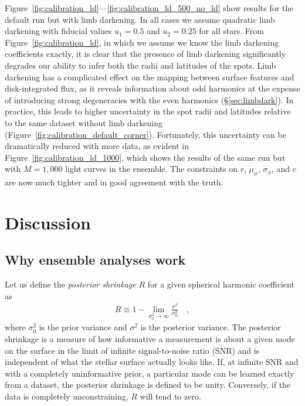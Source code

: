 \documentclass[modern]{aastex62}
\begin{document}
Figure~\ref{fig:calibration_ld}---\ref{fig:calibration_ld_500_no_ld}
show results for the default run but with limb darkening. In all cases
we assume quadratic limb darkening with fiducial values $u_1 = 0.5$
and $u_2 = 0.25$ for all stars. From Figure~\ref{fig:calibration_ld}, in which we
assume we know the limb darkening coefficients exactly, it is clear that
the presence of limb darkening significantly degrades our ability to
infer both the radii and latitudes of the spots. Limb darkening has a complicated
effect on the mapping between surface features and disk-integrated flux, as it
reveals information about odd harmonics at
the expense of introducing strong degeneracies with the even harmonics
(\S\ref{sec:limbdark}). In practice, this leads to higher uncertainty in
the spot radii and latitudes relative to the same dataset without limb
darkening (Figure~\ref{fig:calibration_default_corner}). Fortunately,
this uncertainty can be dramatically reduced with more data, as evident
in Figure~\ref{fig:calibration_ld_1000}, which shows the results of the
same run but with $M=1{,}000$ light curves in the ensemble. The constraints
on $r$, $\mu_\phi$, $\sigma_\phi$, and $c$ are now much tighter and in
good agreement with the truth. 


\section{Discussion}
\label{sec:discussion}

\subsection{Why ensemble analyses work}
\label{sec:ensemble}


Let us define the \emph{posterior shrinkage} $R$ for a given
spherical harmonic coefficient as
%
\begin{align}
    R \equiv 1 - \lim\limits_{\sigma_0^2 \rightarrow \infty}
    \frac{\sigma^2}{\sigma_0^2}
    \quad,
\end{align}
%
where $\sigma_0^2$ is the prior variance
and $\sigma^2$ is the posterior variance.
The posterior shrinkage is a measure of how informative a measurement is about a
given mode on the surface in the limit of infinite signal-to-noise ratio (SNR)
and is independent of what the stellar surface actually looks like.
If, at infinite SNR and with a completely uninformative prior,
a particular mode can be learned exactly from a dataset, the posterior
shrinkage is defined to be unity. Conversely, if the data is completely
unconstraining, $R$ will tend to zero.
\end{document}
